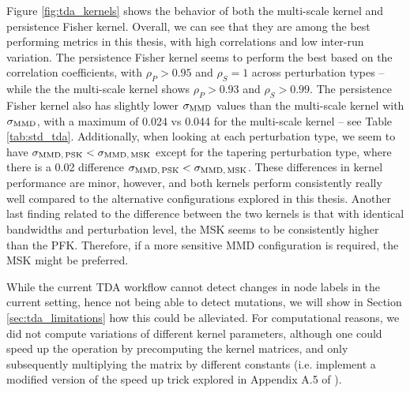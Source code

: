Figure \ref{fig:tda_kernels} shows the behavior of both the multi-scale kernel
and persistence Fisher kernel. Overall, we can see that they are among the best
performing metrics in this thesis, with high correlations and low inter-run
variation. The persistence Fisher kernel seems to perform the best based on the
correlation coefficients, with $\rho_P>0.95$ and $\rho_S=1$ across perturbation
types -- while the the multi-scale kernel shows $\rho_P>0.93$ and $\rho_S>0.99$.
The persistence Fisher kernel also has slightly lower $\sigma_{\text{MMD}}$ values than
the multi-scale kernel with $\sigma_{\text{MMD}}$, with a maximum of 0.024 vs 0.044 for
the multi-scale kernel -- see Table \ref{tab:std_tda}. Additionally, when
looking at each perturbation type, we seem to have $\sigma_{\text{MMD}
  ,\,\text{PSK}}<\sigma_{\text{MMD},\,\text{MSK}}$ except for the tapering
perturbation type, where there is a 0.02 difference $\sigma_{\text{MMD}
,\,\text{PSK}}<\sigma_{\text{MMD},\,\text{MSK}}$. These differences in kernel
performance are minor, however, and both kernels perform consistently really
well compared to the alternative configurations explored in this thesis. Another
last finding related to the difference between the two kernels is that with
identical bandwidths and perturbation level, the MSK seems to be consistently
higher than the PFK. Therefore, if a more sensitive MMD configuration is
required, the MSK might be preferred.

While the current TDA workflow cannot detect changes in node labels in the current setting, hence
not being able to detect mutations, we will show in Section
\ref{sec:tda_limitations} how this could be alleviated. For computational
reasons, we did not compute variations of different kernel parameters, although
one could speed up the operation by precomputing the kernel matrices, and only
subsequently multiplying the matrix by different constants (i.e. implement a
modified version of the speed up trick explored in Appendix A.5 of
\cite{obray2022evaluation}).

